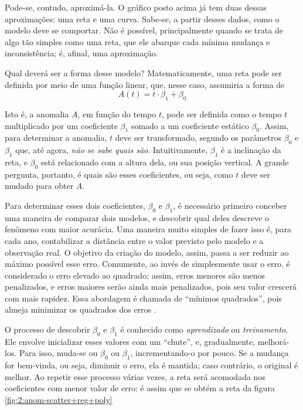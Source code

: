 Pode-se, contudo, aproximá-la.
O gráfico posto acima já tem duas dessas aproximações: uma reta e uma curva.
Sabe-se, a partir desses dados, como o modelo deve se comportar.
Não é possível, principalmente quando se trata de algo tão simples como uma reta, que ele abarque cada mínima mudança e inconsistência; é, afinal, uma aproximação.

Qual deverá ser a forma desse modelo?
Matematicamente, uma reta pode ser definida por meio de uma função linear, que, nesse caso, assumiria a forma de
\begin{equation}
A(t) = t\cdot\beta_1 + \beta_0
\end{equation}

Isto é, a anomalia $A$, em função do tempo $t$, pode ser definida como o tempo $t$ multiplicado por um coeficiente $\beta_1$ somado a um coeficiente estático $\beta_0$.
Assim, para determinar a anomalia, $t$ deve ser transformado, segundo os parâmetros $\beta_0$ e $\beta_1$ que, até agora, \textit{não se sabe quais são}.
Intuitivamente, $\beta_1$ é a inclinação da reta, e $\beta_0$ está relacionado com a altura dela, ou sua posição vertical.
A grande pergunta, portanto, é quais são esses coeficientes, ou seja, como $t$ deve ser mudado para obter $A$.

Para determinar esses dois coeficientes, $\beta_0$ e $\beta_1$, é necessário primeiro conceber uma maneira de comparar dois modelos, e descobrir qual deles descreve o fenômeno com maior acurácia.
Uma maneira muito simples de fazer isso é, para cada ano, contabilizar a distância entre o valor previsto pelo modelo e a observação real.
O objetivo da criação do modelo, assim, passa a ser reduzir ao máximo possível esse erro.
Comumente, ao invés de simplesmente usar o erro, é considerado o erro elevado ao quadrado; assim, erros menores são menos penalizados, e erros maiores serão ainda mais penalizados, pois seu valor crescerá com mais rapidez.
Essa abordagem é chamada de ``mínimos quadrados'', pois almeja minimizar os quadrados dos erros \cite{james_introduction_2021a}.

O processo de descobrir $\beta_0$ e $\beta_1$ é conhecido como \textit{aprendizado} ou \textit{treinamento}.
Ele envolve inicializar esses valores com um ``chute'', e, gradualmente, melhorá-los.
Para isso, muda-se ou $\beta_0$ ou $\beta_1$, incrementando-o por pouco. 
Se a mudança for bem-vinda, ou seja, diminuir o erro, ela é mantida; caso contrário, o original é melhor.
Ao repetir esse processo várias vezes, a reta será acomodada nos coeficientes com menor valor de erro: é assim que se obtém a reta da figura \ref{fig:2:anom-scatter+reg+poly}

